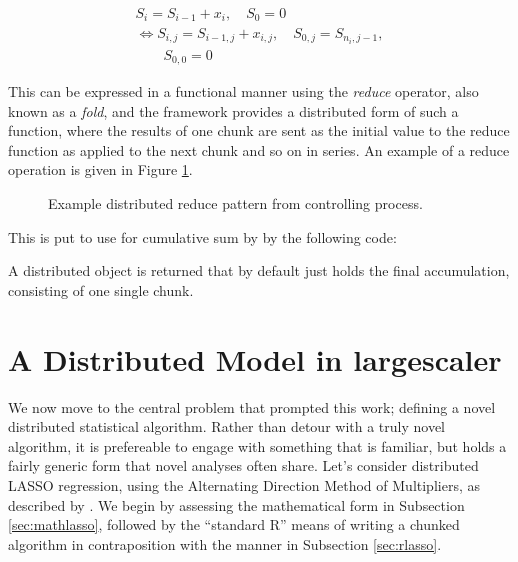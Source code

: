 \documentclass[letterpaper, inpress]{jds} %
\begin{document}
\begin{equation}
\begin{gathered}\label{eqn:cumsum}
    S_i = S_{i-1}+x_i, \quad S_0 = 0\\
    \iff S_{i,j} = S_{i-1,j} + x_{i,j}, \quad S_{0,j} = S_{n_i,j-1},\\
    \qquad S_{0,0} = 0
\end{gathered}
\end{equation}

This can be expressed in a functional manner using the \textit{reduce} operator, also known as a \textit{fold}, and the  framework provides a distributed form of such a function, where the results of one chunk are sent as the initial value to the reduce function as applied to the next chunk and so on in series.
An example of a reduce operation is given in Figure \ref{fig:dreduce}.

\begin{figure}[ht]
\begin{center}
    
\caption{Example distributed reduce pattern from controlling process.}
\label{fig:dreduce}
\end{center}
\end{figure}

This is put to use for cumulative sum by  by the following code:


A distributed object is returned that by default just holds the final accumulation, consisting of one single chunk.

\section{A Distributed Model in largescaler}

We now move to the central problem that prompted this work; defining a novel distributed statistical algorithm.
Rather than detour with a truly novel algorithm, it is prefereable to engage with something that is familiar, but holds a fairly generic form that novel analyses often share.
Let's consider distributed LASSO regression, using the Alternating Direction Method of Multipliers, as described by \citet{mateos2010}.
We begin by assessing the mathematical form in Subsection \ref{sec:mathlasso}, followed by the ``standard R'' means of writing a chunked algorithm in contraposition with the  manner in Subsection \ref{sec:rlasso}.
\end{document}
